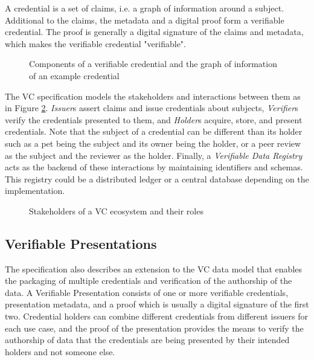 A credential is a set of claims, i.e. a graph of information around a subject. Additional to the claims, the metadata and a digital proof form a verifiable credential. The proof is generally a digital signature of the claims and metadata, which makes the verifiable credential "verifiable".

\begin{figure}[htbp]
  \centering
  
  
  \caption{Components of a verifiable credential and the graph of information of an example credential \parencite{Sporny.18Kas2019}} \label{fig:credentialGraph}
\end{figure}

The \acrshort{VC} specification models the stakeholders and interactions between them as in Figure \ref{fig:ecosystem}. \textit{Issuer}s assert claims and issue credentials about subjects, \textit{Verifier}s verify the credentials presented to them, and \textit{Holder}s acquire, store, and present credentials. Note that the subject of a credential can be different than its holder such as a pet being the subject and its owner being the holder, or a peer review as the subject and the reviewer as the holder. Finally, a \textit{Verifiable Data Registry} acts as the backend of these interactions by maintaining identifiers and schemas. This registry could be a distributed ledger or a central database depending on the implementation.

\begin{figure}[htbp]
  \centering
  
  \caption{Stakeholders of a \acrlong{VC} ecosystem and their roles \parencite{Sporny.18Kas2019}} \label{fig:ecosystem}
\end{figure}

\subsection{Verifiable Presentations}

The specification also describes an extension to the \acrshort{VC} data model that enables the packaging of multiple credentials and verification of the authorship of the data. A Verifiable Presentation consists of one or more verifiable credentials, presentation metadata, and a proof which is usually a digital signature of the first two. Credential holders can combine different credentials from different issuers for each use case, and the proof of the presentation provides the means to verify the authorship of data that the credentials are being presented by their intended holders and not someone else.

